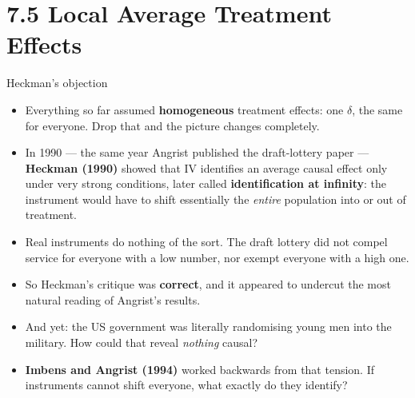 \documentclass[
  11pt,
  ignorenonframetext,
  aspectratio=169,
]{beamer}
\providecommand{\tightlist}{%
  \setlength{\itemsep}{0pt}\setlength{\parskip}{0pt}}
\begin{document}
\section{7.5 Local Average Treatment
Effects}\label{local-average-treatment-effects}

\begin{frame}{Heckman's objection}
\protect{}\label{heckmans-objection}
\begin{itemize}
\tightlist
\item
  Everything so far assumed \textbf{homogeneous} treatment effects: one
  \(\delta\), the same for everyone. Drop that and the picture changes
  completely.
\item
  In 1990 --- the same year Angrist published the draft-lottery paper
  --- \textbf{Heckman (1990)} showed that IV identifies an average
  causal effect only under very strong conditions, later called
  \textbf{identification at infinity}: the instrument would have to
  shift essentially the \emph{entire} population into or out of
  treatment.
\item
  Real instruments do nothing of the sort. The draft lottery did not
  compel service for everyone with a low number, nor exempt everyone
  with a high one.
\item
  So Heckman's critique was \textbf{correct}, and it appeared to
  undercut the most natural reading of Angrist's results.
\item
  And yet: the US government was literally randomising young men into
  the military. How could that reveal \emph{nothing} causal?
\item
  \textbf{Imbens and Angrist (1994)} worked backwards from that tension.
  If instruments cannot shift everyone, what exactly do they identify?
\end{itemize}
\end{frame}
\end{document}
